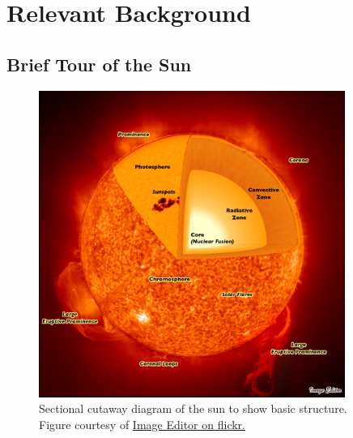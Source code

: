 \chapter{Relevant Background}
\label{chapterbackground}

\section{Brief Tour of the Sun}

\begin{figure}[!h]
    \begin{center}
	    \includegraphics[width=100mm]{Images/SunStructureCutAway.png}
    \end{center}
    \caption[Sun structure cutaway]{
        Sectional cutaway diagram of the sun to show basic structure. 
        Figure courtesy of 
        \href{https://www.flickr.com/photos/11304375@N07/2819311727/}{Image Editor on flickr.}
    }
    \label{fig:suncutaway}
\end{figure}

